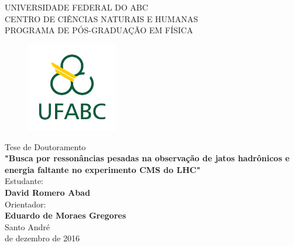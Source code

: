 \begin{titlepage}

\noindent  UNIVERSIDADE FEDERAL DO ABC \\
\noindent  CENTRO DE CIÊNCIAS NATURAIS E HUMANAS\\
\noindent  PROGRAMA DE PÓS-GRADUAÇÃO EM  FÍSICA\\


\begin{figure}[htb]
\begin{center}
\includegraphics[width=4cm]{Titlefig/logo}
\end{center}
\end{figure}



\begin{center}
\noindent \Large Tese de Doutoramento\\
\vspace*{0.5cm}
\noindent \Large \textbf{"Busca por ressonâncias pesadas na observação de jatos hadrônicos e energia faltante no experimento CMS do LHC"}\\
\vspace*{0.5cm}
\noindent   Estudante: \\
\vspace*{0.5cm}
\noindent \Large \textbf{David Romero Abad} \\
\vspace*{0.5cm}
\noindent  Orientador:   \\
\vspace*{0.5cm}
\noindent \Large  \textbf{Eduardo de Moraes Gregores}\\
\vspace*{0.5cm}
\noindent   Santo André \\
\vspace*{0.5cm}
 de dezembro de 2016 \\
\end{center}
\end{titlepage}
\titlepage

\newpage
$\ $
\thispagestyle{empty}
